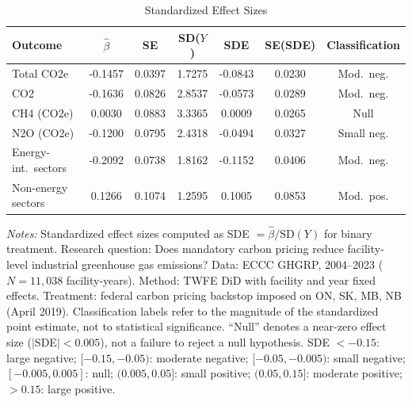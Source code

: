 \begin{table}[htbp]
\centering
\caption{Standardized Effect Sizes}
\label{tab:sde}
\small
\begin{tabular}{l cccccc}
\hline\hline
Outcome & $\hat{\beta}$ & SE & SD($Y$) & SDE & SE(SDE) & Classification \\
\hline
Total CO2e & -0.1457 & 0.0397 & 1.7275 & -0.0843 & 0.0230 & Mod.\ neg. \\
CO2 & -0.1636 & 0.0826 & 2.8537 & -0.0573 & 0.0289 & Mod.\ neg. \\
CH4 (CO2e) & 0.0030 & 0.0883 & 3.3365 & 0.0009 & 0.0265 & Null \\
N2O (CO2e) & -0.1200 & 0.0795 & 2.4318 & -0.0494 & 0.0327 & Small neg. \\
Energy-int.\ sectors & -0.2092 & 0.0738 & 1.8162 & -0.1152 & 0.0406 & Mod.\ neg. \\
Non-energy sectors & 0.1266 & 0.1074 & 1.2595 & 0.1005 & 0.0853 & Mod.\ pos. \\
\hline\hline
\end{tabular}
\begin{minipage}{0.95\textwidth}
\footnotesize
\textit{Notes:} Standardized effect sizes computed as SDE $= \hat{\beta} / \text{SD}(Y)$ for binary treatment.
Research question: Does mandatory carbon pricing reduce facility-level industrial greenhouse gas emissions?
Data: ECCC GHGRP, 2004--2023 ($N = 11,038$ facility-years). Method: TWFE DiD with facility and year fixed effects.
Treatment: federal carbon pricing backstop imposed on ON, SK, MB, NB (April 2019).
Classification labels refer to the magnitude of the standardized point estimate, not to statistical significance. ``Null'' denotes a near-zero effect size ($|$SDE$| < 0.005$), not a failure to reject a null hypothesis.
SDE $< -0.15$: large negative; $[-0.15, -0.05)$: moderate negative; $[-0.05, -0.005)$: small negative;
$[-0.005, 0.005]$: null; $(0.005, 0.05]$: small positive; $(0.05, 0.15]$: moderate positive; $> 0.15$: large positive.
\end{minipage}
\end{table}
